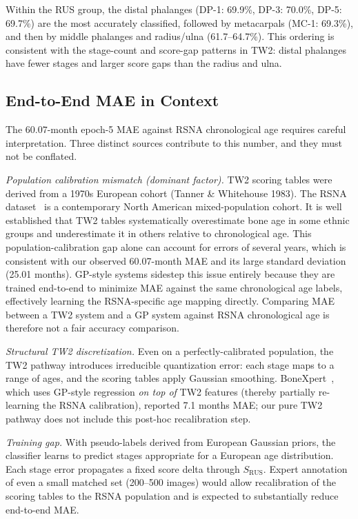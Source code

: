 \documentclass[journal]{IEEEtran}
\begin{document}
Within the RUS group, the distal phalanges (DP-1: 69.9\%, DP-3:
70.0\%, DP-5: 69.7\%) are the most accurately classified, followed
by metacarpals (MC-1: 69.3\%), and then by middle phalanges and
radius/ulna (61.7--64.7\%).
This ordering is consistent with the stage-count and score-gap
patterns in TW2: distal phalanges have fewer stages and larger
score gaps than the radius and ulna.

\subsection{End-to-End MAE in Context}

The $60.07$-month epoch-5 MAE against RSNA chronological age
requires careful interpretation.
Three distinct sources contribute to this number, and they must not
be conflated.

\textit{Population calibration mismatch (dominant factor).}
TW2 scoring tables were derived from a 1970s European cohort
(Tanner \& Whitehouse 1983).
The RSNA dataset~\cite{halabi2019} is a contemporary North American
mixed-population cohort.
It is well established that TW2 tables systematically overestimate
bone age in some ethnic groups and underestimate it in others
relative to chronological age.
This population-calibration gap alone can account for errors of
several years, which is consistent with our observed 60.07-month
MAE and its large standard deviation (25.01 months).
GP-style systems sidestep this issue entirely because they are
trained end-to-end to minimize MAE against the same chronological
age labels, effectively learning the RSNA-specific age mapping
directly.
Comparing MAE between a TW2 system and a GP system against RSNA
chronological age is therefore not a fair accuracy comparison.

\textit{Structural TW2 discretization.}
Even on a perfectly-calibrated population, the TW2 pathway
introduces irreducible quantization error: each stage maps to a
range of ages, and the scoring tables apply Gaussian smoothing.
BoneXpert~\cite{thodberg2009}, which uses GP-style regression
\textit{on top of} TW2 features (thereby partially re-learning
the RSNA calibration), reported 7.1 months MAE; our pure TW2 pathway
does not include this post-hoc recalibration step.

\textit{Training gap.}
With pseudo-labels derived from European Gaussian priors, the
classifier learns to predict stages appropriate for a European
age distribution.
Each stage error propagates a fixed score delta through $S_{\text{RUS}}$.
Expert annotation of even a small matched set (200--500 images)
would allow recalibration of the scoring tables to the RSNA population
and is expected to substantially reduce end-to-end MAE.
\end{document}
